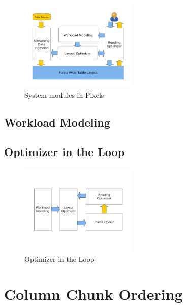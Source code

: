 \begin{figure}[h!]
	\vspace{-1em}
	\centering
	\includegraphics[width=0.5\textwidth, height=0.36\textwidth]{figs/overview}
	\vspace{-3em}
	\caption{System modules in Pixels}\label{fig:overview}
	\vspace{-0em}
\end{figure}

\subsection{Workload Modeling}
\label{subsec:workload-modeling}


\subsection{Optimizer in the Loop}
\label{subsec:optimizer-in-the-loop}

\begin{figure}[h!]
	\vspace{-3em}
	\centering
	\includegraphics[width=0.5\textwidth, height=0.36\textwidth]{figs/loop}
	\vspace{-6em}
	\caption{Optimizer in the Loop}\label{fig:loop}
	\vspace{-0em}
\end{figure}


\section{Column Chunk Ordering}
\label{subsec:column-chunk-ordering}
